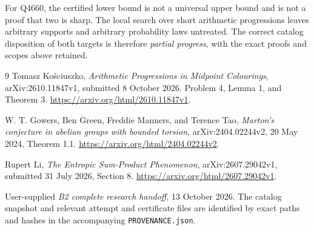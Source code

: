 \documentclass[11pt]{article}
\theoremstyle{remark}
\begin{document}
For Q4660, the certified lower bound is not a universal upper bound and
is not a proof that two is sharp. The local search over short arithmetic
progressions leaves arbitrary supports and arbitrary probability laws
untreated. The correct catalog disposition of both targets is therefore
\emph{partial progress}, with the exact proofs and scopes above retained.

\begingroup
\small
\begin{thebibliography}{9}
\setlength{\itemsep}{2pt}
Tomasz Ko\'sciuszko,
\emph{Arithmetic Progressions in Midpoint Colourings},
arXiv:2610.11847v1, submitted 8 October 2026.
Problem 4, Lemma 1, and Theorem 3.
\url{https://arxiv.org/html/2610.11847v1}.

W. T. Gowers, Ben Green, Freddie Manners, and Terence Tao,
\emph{Marton's conjecture in abelian groups with bounded torsion},
arXiv:2404.02244v2, 20 May 2024, Theorem 1.1.
\url{https://arxiv.org/html/2404.02244v2}.

Rupert Li,
\emph{The Entropic Sum-Product Phenomenon},
arXiv:2607.29042v1, submitted 31 July 2026, Section 8.
\url{https://arxiv.org/html/2607.29042v1}.

User-supplied \emph{B2 complete research handoff}, 13 October 2026.
The catalog snapshot and relevant attempt and certificate files are
identified by exact paths and hashes in the accompanying
\texttt{PROVENANCE.json}.
\end{thebibliography}
\endgroup
\end{document}
